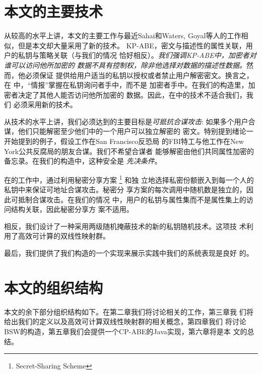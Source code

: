 \section{本文的主要技术}
从较高的水平上讲，本文的主要工作与最近Sahai和Waters\cite{SW:FuzzyIBE},
Goyal等人\cite{GPSW:ABE}的工作相似，但是本文却大量采用了新的技术。
KP-ABE，密文与描述性的属性关联，用户的私钥与策略关联（与我们的情况
恰好相反）。\textit{我们强调KP-ABE中，加密者对谁可以访问他所加密的
数据不具有控制权，除非他选择对数据的描述性数据。}然而，他必须保证
提供给用户适当的私钥以授权或者禁止用户解密密文。换言之，在
\cite{SW:FuzzyIBE,GPSW:ABE}中，“情报”掌握在私钥询问者手中，而不是
加密者手中。在我们的构造里，加密者决定了其他人能否访问他所加密的
数据。因此，在\cite{SW:FuzzyIBE,GPSW:ABE}中的技术不适合我们，我们
必须采用新的技术。\par
从技术的水平上讲，我们必须达到的主要目标是\textit{可抵抗合谋攻击}:
如果多个用户合谋，他们只能解密至少他们中的一个用户可以独立解密的
密文。特别提到绪论一开始提到的例子，假设工作在San Francisco反恐局
的FBI特工与他工作在New York公共反腐局的朋友合谋。我们不希望合谋者
能够解密由他们共同属性加密的备忘录。在我们的构造中，这种安全是
\textit{先决条件}。\par
在\cite{SW:FuzzyIBE,GPSW:ABE}的工作中，通过利用秘密分享方案
\footnote{Secret-Sharing Scheme} \cite{Shamir:SSS,Blakley:SSS}和独
立地选择私密份额嵌入到每一个人的私钥中来保证可地址合谋攻击。秘密分
享方案的每次调用中随机数是独立的，因此可抵制合谋攻击。在我们的情况
中，用户的私钥与属性集而不是属性集上的访问结构关联，因此秘密分享方
案不适用。\par
相反，我们设计了一种采用两级随机掩蔽技术的新的私钥随机技术。这项技
术利用了高效可计算的双线性映射群。\par
最后，我们提供了我们构造的一个实现来展示实践中我们的系统表现是良好
的。
\section{本文的组织结构}
本文的余下部分组织结构如下。在第二章我们将讨论相关的工作，第三章我
们将给出我们的定义以及高效可计算双线性映射群的相关概念，第四章我们
将讨论BSW的构造，第五章我们会提供一个CP-ABE的Java实现，第六章将是本
文的总结。
